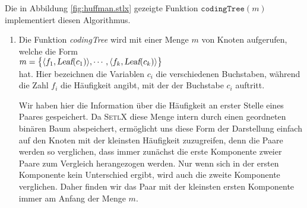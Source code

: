 \noindent
Die in Abbildung \ref{fig:huffman.stlx} gezeigte Funktion $\mathtt{codingTree}(m)$
implementiert diesen Algorithmus. 
\begin{enumerate}
\item Die Funktion \textsl{codingTree} wird mit einer Menge $m$ von Knoten aufgerufen,
      welche die Form
      \\[0.2cm]
      \hspace*{1.3cm}
      $m = \bigl\{ \langle f_1, \textsl{Leaf}(c_1) \rangle, \cdots, 
                  \langle f_k, \textsl{Leaf}(c_k) \rangle \bigr\}   
      $
      \\[0.2cm]
      hat.  Hier bezeichnen die Variablen $c_i$ die verschiedenen Buchstaben, w\"ahrend die
      Zahl $f_i$ die H\"aufigkeit angibt, mit der der Buchstabe $c_i$ auftritt.

      Wir haben hier die Information \"uber die H\"aufigkeit an erster Stelle eines Paares gespeichert.
      Da \textsc{SetlX} diese Menge intern durch einen geordneten bin\"aren Baum
      abspeichert, erm\"oglicht uns diese Form der Darstellung einfach auf den Knoten mit
      der kleinsten H\"aufigkeit zuzugreifen, denn die Paare werden so verglichen, dass
      immer zun\"achst die erste Komponente zweier Paare zum Vergleich herangezogen werden.
      Nur wenn sich in der ersten Komponente kein Unterschied ergibt, wird auch die zweite
      Komponente verglichen.  Daher finden wir das Paar mit der kleinsten ersten
      Komponente immer am Anfang der Menge $m$.


\end{enumerate}
